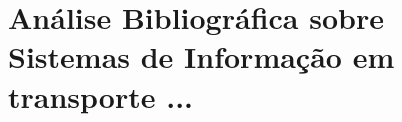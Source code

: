\chapter{Análise Bibliográfica sobre Sistemas de Informação em transporte ...\label{chap:bibliometria:MoustacheGolem}}
